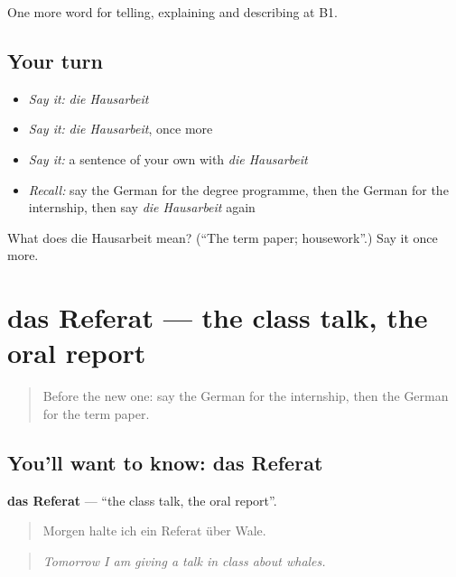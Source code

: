 \begin{grammarlens}[title={What you've built}]
One more word for telling, explaining and describing at B1.
\end{grammarlens}

\subsection*{Your turn}
\begin{itemize}
\raggedright
  \item \emph{Say it:} \emph{die Hausarbeit}
  \item \emph{Say it:} \emph{die Hausarbeit}, once more
  \item \emph{Say it:} a sentence of your own with \emph{die Hausarbeit}
  \item \emph{Recall:} say the German for the degree programme, then the German for the internship, then say \emph{die Hausarbeit} again
\end{itemize}

\begin{tcolorbox}[breakable,colback=teal!4,colframe=teal!35!black,title={Before you move on}]
What does die Hausarbeit mean? (\textquotedblleft{}The term paper; housework\textquotedblright{}.) Say it once more.
\end{tcolorbox}
\section[das Referat]{das Referat — the class talk, the oral report}

\label{lesson:GE-C378-referat}



\begin{quote}
Before the new one: say the German for the internship, then the German for the term paper.
\end{quote}

\subsection*{You'll want to know: das Referat}
\textbf{das Referat} — \textquotedblleft{}the class talk, the oral report\textquotedblright{}.

\begin{quote}
Morgen halte ich ein Referat über Wale.
\end{quote}

\begin{quote}
\emph{Tomorrow I am giving a talk in class about whales.}
\end{quote}

